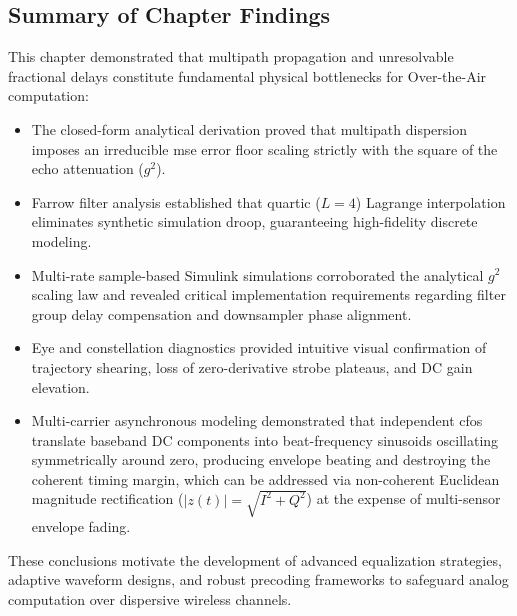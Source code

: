 \documentclass[Markos_Delaportas_1316.tex]{subfiles}
\begin{document}
\subsection{Summary of Chapter Findings}
\label{subsec:summary_chapter_findings}
This chapter demonstrated that multipath propagation and unresolvable
fractional delays constitute fundamental physical bottlenecks
for Over-the-Air computation:
\begin{itemize}[leftmargin=*]
    \item The closed-form analytical derivation proved that multipath
        dispersion imposes an irreducible \gls{mse} error floor
        scaling strictly with the square of the echo attenuation ($g^2$).
    \item Farrow filter analysis established that quartic ($L=4$)
        Lagrange interpolation eliminates synthetic simulation droop,
        guaranteeing high-fidelity discrete modeling.
    \item Multi-rate sample-based Simulink simulations corroborated
        the analytical $g^2$ scaling law and revealed critical
        implementation requirements regarding filter group delay
        compensation and downsampler phase alignment.
    \item Eye and constellation diagnostics provided intuitive visual
        confirmation of trajectory shearing, loss of zero-derivative
        strobe plateaus, and DC gain elevation.
    \item Multi-carrier asynchronous modeling demonstrated that independent
        \glspl{cfo} translate baseband DC components into
        beat-frequency sinusoids
        oscillating symmetrically around zero, producing envelope beating and
        destroying the coherent timing margin, which can be addressed via
        non-coherent Euclidean magnitude rectification ($|z(t)| =
        \sqrt{I^2 + Q^2}$)
        at the expense of multi-sensor envelope fading.
\end{itemize}
These conclusions motivate the development of advanced equalization
strategies, adaptive waveform designs, and robust precoding
frameworks to safeguard analog computation over dispersive wireless channels.

\ifSubfilesClassLoaded{
    \clearpage
    \printbibliography
}{}
\end{document}
